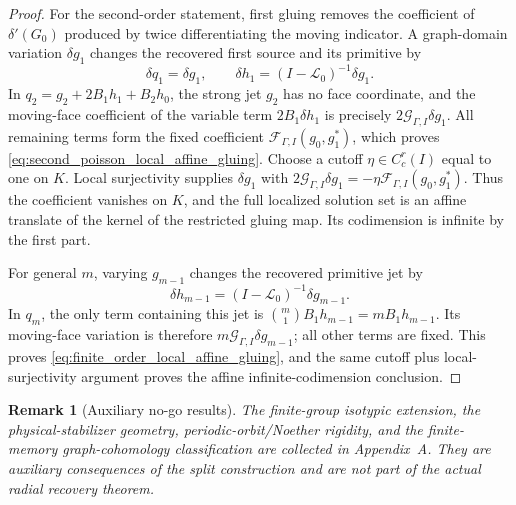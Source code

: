 \documentclass[11pt]{amsart}
\theoremstyle{compactplain}
\theoremstyle{compactdefinition}
\theoremstyle{compactremark}
\newtheorem*{remark*}{Remark}
\newcommand{\Ltransfer}{\mathscr L}
\begin{document}
\begin{proof}
For the second-order statement, first gluing removes the coefficient of
\(\delta'(G_0)\) produced by twice differentiating the moving indicator.  A
graph-domain variation \(\delta g_1\) changes the recovered first source and its
primitive by
\[
 \delta q_1=\delta g_1,\qquad
 \delta h_1=(I-\Ltransfer_0)^{-1}\delta g_1.
\]
In \(q_2=g_2+2B_1h_1+B_2h_0\), the strong jet \(g_2\) has no face
coordinate, and the moving-face coefficient of the variable term
\(2B_1\delta h_1\) is precisely
\(2\mathcal G_{\Gamma,I}\delta g_1\).  All remaining terms form the fixed
coefficient \(\mathcal F_{\Gamma,I}(g_0,g_1^*)\), which proves
\eqref{eq:second_poisson_local_affine_gluing}.  Choose a cutoff
\(\eta\in C_c^r(I)\) equal to one on \(K\).  Local surjectivity supplies
\(\delta g_1\) with
\(2\mathcal G_{\Gamma,I}\delta g_1
=-\eta\mathcal F_{\Gamma,I}(g_0,g_1^*)\).
Thus the coefficient vanishes on \(K\), and the full localized solution set is
an affine translate of the kernel of the restricted gluing map.  Its
codimension is infinite by the first part.

For general \(m\), varying \(g_{m-1}\) changes the recovered primitive jet by
\[
 \delta h_{m-1}=(I-\Ltransfer_0)^{-1}\delta g_{m-1}.
\]
In \(q_m\), the only term containing this jet is
\(\binom m1B_1h_{m-1}=mB_1h_{m-1}\).  Its moving-face variation is therefore
\(m\mathcal G_{\Gamma,I}\delta g_{m-1}\); all other terms are fixed.  This
proves \eqref{eq:finite_order_local_affine_gluing}, and the same cutoff plus
local-surjectivity argument proves the affine infinite-codimension conclusion.
\end{proof}

\begin{remark*}[Auxiliary no-go results]
The finite-group isotypic extension, the physical-stabilizer geometry,
periodic-orbit/Noether rigidity, and the finite-memory graph-cohomology
classification are collected in Appendix~A.  They are auxiliary consequences
of the split construction and are not part of the actual radial
recovery theorem.
\end{remark*}
\end{document}

